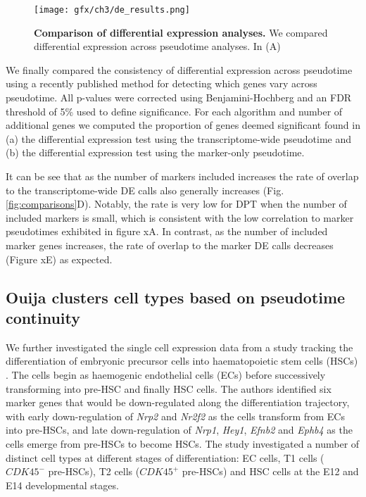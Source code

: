 {\begin{figure}[!t]
	\centering
	\texttt{[image: gfx/ch3/de\_results.png]}
	\caption{\textbf{Comparison of differential expression analyses.} We compared differential expression across pseudotime analyses. In (A)  }
	\label{fig:de_results}
\end{figure}

We finally compared the consistency of differential expression across pseudotime using a recently published method for detecting which genes vary across pseudotime. All p-values were corrected using Benjamini-Hochberg and an FDR threshold of 5\% used to define significance. For each algorithm and number of additional genes we computed the proportion of genes deemed significant found in (a) the differential expression test using the transcriptome-wide pseudotime and (b) the differential expression test using the marker-only pseudotime.

It can be see that as the number of markers included increases the rate of overlap to the transcriptome-wide DE calls also generally increases (Fig. \ref{fig:comparisons}D). Notably, the rate is very low for DPT when the number of included markers is small, which is consistent with the low correlation to marker pseudotimes exhibited in figure xA. In contrast, as the number of included marker genes increases, the rate of overlap to the marker DE calls decreases (Figure xE) as expected.

}

\subsection{Ouija clusters cell types based on pseudotime continuity}

We further investigated the single cell expression data from a study tracking the differentiation of embryonic precursor cells into haematopoietic stem cells (HSCs) \cite{zhou2016tracing}. The cells begin as haemogenic endothelial cells (ECs) before successively transforming  into pre-HSC and finally HSC cells. The authors identified six marker genes that would be down-regulated along the differentiation trajectory, with early down-regulation of \emph{Nrp2} and \emph{Nr2f2} as the cells transform from ECs into pre-HSCs, and late down-regulation of \emph{Nrp1}, \emph{Hey1}, \emph{Efnb2} and \emph{Ephb4} as the cells emerge from pre-HSCs to become HSCs. The study investigated a number of distinct cell types at different stages of differentiation: EC cells, T1 cells ($CDK45^-$ pre-HSCs), T2 cells ($CDK45^+$ pre-HSCs) and HSC cells at the E12 and E14 developmental stages.

